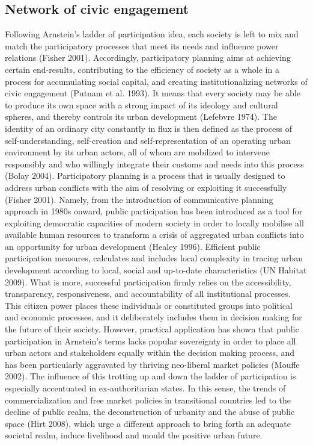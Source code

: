 \documentclass[11pt]{report}
\begin{document}
\subsection{Network of civic engagement}

Following Arnstein’s ladder of participation idea, each society is left to mix and match the participatory processes that meet its needs and influence power relations (Fisher 2001). Accordingly, participatory planning aims at achieving certain end-results, contributing to the efficiency of society as a whole in a process for accumulating social capital, and creating institutionalizing networks of civic engagement (Putnam et al. 1993). It means that every society may be able to produce its own space with a strong impact of its ideology and cultural spheres, and thereby controls its urban development (Lefebvre 1974). The identity of an ordinary city constantly in flux is then defined as the process of self-understanding, self-creation and self-representation of an operating urban environment by its urban actors, all of whom are mobilized to intervene responsibly and who willingly integrate their customs and needs into this process (Bolay 2004).
Participatory planning is a process that is usually designed to address urban conflicts with the aim of resolving or exploiting it successfully (Fisher 2001). Namely, from the introduction of communicative planning approach in 1980s onward, public participation has been introduced as a tool for exploiting democratic capacities of modern society in order to locally mobilise all available human resources to transform a crisis of aggregated urban conflicts into an opportunity for urban development (Healey 1996). Efficient public participation measures, calculates and includes local complexity in tracing urban development according to local, social and up-to-date characteristics (UN Habitat 2009). What is more, successful participation firmly relies on the accessibility, transparency, responsiveness, and accountability of all institutional processes. This citizen power places these individuals or constituted groups into political and economic processes, and it deliberately includes them in decision making for the future of their society.
However, practical application has shown that public participation in Arnstein’s terms lacks popular sovereignty in order to place all urban actors and stakeholders equally within the decision making process, and has been particularly aggravated by thriving neo-liberal market policies (Mouffe 2002). The influence of this trotting up and down the ladder of participation is especially accentuated in ex-authoritarian states. In this sense, the trends of commercialization and free market policies in transitional countries led to the decline of public realm, the deconstruction of urbanity and the abuse of public space (Hirt 2008), which urge a different approach to bring forth an adequate societal realm, induce livelihood and mould the positive urban future.
\end{document}
